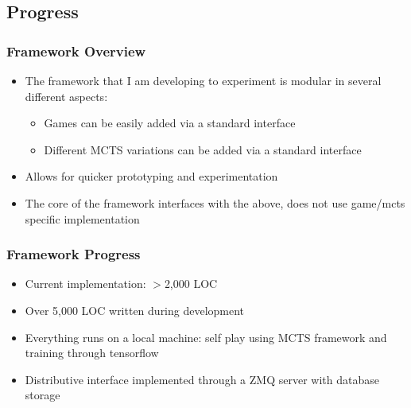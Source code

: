 \documentclass{beamer}
\begin{document}

\subsection{Progress}


\begin{frame}
  \frametitle{Framework Overview}

  \begin{itemize}
    \item The framework that I am developing to experiment is modular in several different aspects:
      \begin{itemize}
        \item Games can be easily added via a standard interface
        \item Different MCTS variations can be added via a standard interface
      \end{itemize}
    \item Allows for quicker prototyping and experimentation
    \item The core of the framework interfaces with the above, does not use game/mcts specific implementation
  \end{itemize}
\end{frame}



\begin{frame}
  \frametitle{Framework Progress}

  \begin{itemize}
    \item Current implementation: $>$2,000 LOC
    \item Over 5,000 LOC written during development
    \item Everything runs on a local machine: self play using MCTS framework and training through tensorflow
    \item Distributive interface implemented through a ZMQ server with database storage
  \end{itemize}
\end{frame}


\end{document}
